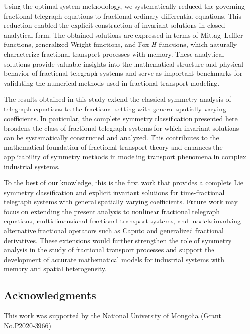 \documentclass[12pt]{amsart}
\begin{document}
Using the optimal system methodology, we systematically reduced the governing fractional telegraph equations to fractional ordinary differential equations. This reduction enabled the explicit construction of invariant solutions in closed analytical form. The obtained solutions are expressed in terms of Mittag–Leffler functions, generalized Wright functions, and Fox $H$-functions, which naturally characterize fractional transport processes with memory. These analytical solutions provide valuable insights into the mathematical structure and physical behavior of fractional telegraph systems and serve as important benchmarks for validating the numerical methods used in fractional transport modeling.

The results obtained in this study extend the classical symmetry analysis of telegraph equations to the fractional setting with general spatially varying coefficients. In particular, the complete symmetry classification presented here broadens the class of fractional telegraph systems for which invariant solutions can be systematically constructed and analyzed. This contributes to the mathematical foundation of fractional transport theory and enhances the applicability of symmetry methods in modeling transport phenomena in complex industrial systems.

To the best of our knowledge, this is the first work that provides a complete Lie symmetry classification and explicit invariant solutions for time-fractional telegraph systems with general spatially varying coefficients.
Future work may focus on extending the present analysis to nonlinear fractional telegraph equations, multidimensional fractional transport systems, and models involving alternative fractional operators such as Caputo and generalized fractional derivatives. These extensions would further strengthen the role of symmetry analysis in the study of fractional transport processes and support the development of accurate mathematical models for industrial systems with memory and spatial heterogeneity.



\subsection*{Acknowledgments}
 This work was supported by the National University of Mongolia (Grant No.P2020-3966)




\end{document}
